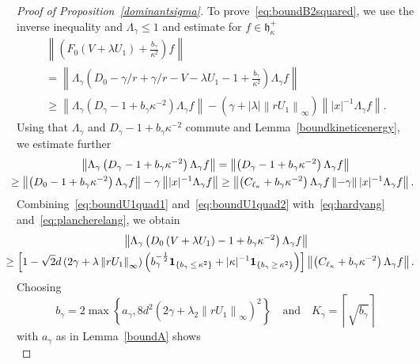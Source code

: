 \documentclass[AHL,Unicode,longabstracts,published]{cedram}
\newcommand{\one}{\mathbf{1}}
\newcommand*\gh{\mathfrak{h}}
\newcommand*\ghpk{{\gh^+_\kappa}}
\begin{document}
\begin{proof}[Proof of Proposition~\ref{dominantsigma}]
To prove~\eqref{eq:boundB2squared}, we use the inverse inequality and $\Lambda_\gamma\leq1$ and estimate for $f\in\ghpk$
\begin{multline}\label{eq:boundU1quad1}
\left\|\left(F_0\left(V+\lambda U_1\right)+\frac{b_\gamma}{\kappa^2}\right)f\right\|\\
= \left\|\Lambda_\gamma\left(D_0-\gamma/r+\gamma/r-V-\lambda U_1-1+\frac{b_\gamma}{\kappa^2}\right)\Lambda_\gamma f\right\|\\
\geq \left\|\Lambda_\gamma\left(D_\gamma-1+b_\gamma\kappa^{-2}\right)\Lambda_\gamma f\right\| - \left(\gamma+|\lambda|\left\|rU_1\right\|_\infty\right)\left\||x|^{-1}\Lambda_\gamma f\right\|.
\end{multline}
Using that $\Lambda_\gamma$ and $D_\gamma-1+b_\gamma\kappa^{-2}$ commute and Lemma~\ref{boundkineticenergy}, we estimate further
\begin{multline}\label{eq:boundU1quad2}
\left\|\Lambda_\gamma\left(D_\gamma-1+b_\gamma\kappa^{-2}\right)\Lambda_\gamma f\right\| =\left\|\left(D_\gamma-1+b_\gamma\kappa^{-2}\right)\Lambda_\gamma f\right\|\\
\mkern-10mu
\geq \left\|\left(D_0-1+b_\gamma\kappa^{-2}\right)\Lambda_\gamma f\right\| - \gamma\left\||x|^{-1}\Lambda_\gamma f\right\|
\geq \left\|\left(C_{\ell_\kappa}+b_\gamma\kappa^{-2}\right)\Lambda_\gamma f\left\| - \gamma\right\||x|^{-1}\Lambda_\gamma f\right\|.
\end{multline}
Combining~\eqref{eq:boundU1quad1} and~\eqref{eq:boundU1quad2} with~\eqref{eq:hardyang} and~\eqref{eq:plancherelang}, we obtain
\begin{multline*}
\left\|\Lambda_\gamma\left(D_0\left(V+\lambda U_1\right)-1+b_\gamma\kappa^{-2}\right)\Lambda_\gamma f\right\| \\
\mkern-20mu \geq\left[1-\sqrt{2}d\left(2\gamma+\lambda\left\|rU_1\right\|_\infty\right)\left(b_\gamma^{-\frac12}\one_{\left\{b_\gamma\,\leq\,\kappa^2\right\}} + |\kappa|^{-1}\one_{\left\{b_\gamma\,\geq\,\kappa^2\right\}}\right)\right] \left\|\left(C_{\ell_\kappa}+b_\gamma\kappa^{-2}\right)\Lambda_\gamma f\right\|.
\end{multline*}
Choosing
\begin{equation}\label{eq:gammacond}
b_\gamma = 2\max\left\{a_\gamma,8d^2\left(2\gamma+\lambda_2\left\|rU_1\right\|_\infty\right)^2\right\}
\quad\text{and}\quad K_\gamma = \left\lceil\sqrt{b_\gamma}\right\rceil
\end{equation}
with $a_\gamma$ as in Lemma~\ref{boundA} shows
\begin{equation}\label{eq:boundU1quad}

\end{equation}
\end{proof}
\end{document}
